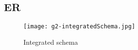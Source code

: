 \newpage

\subsection{ER}

\begin{figure}[hbt!]
	\centering
	\texttt{[image: g2-integratedSchema.jpg]}
	\caption{Integrated schema}
\end{figure}

\newpage